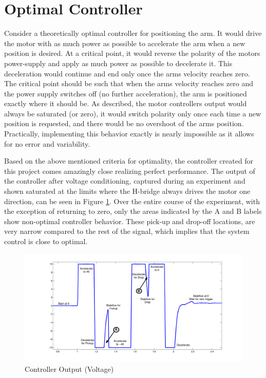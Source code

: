 \section{Optimal Controller}
\label{sec:idealcontroller}

Consider a theoretically optimal controller for positioning the arm.
It would drive the motor with as much power as possible to accelerate the arm when a new position is desired.
At a critical point, it would reverse the polarity of the motors power-supply and apply as much power as possible to decelerate it.
This deceleration would continue and end only once the arms velocity reaches zero.
The critical point should be such that when the arms velocity reaches zero and the power supply switches off (no further acceleration), the arm is positioned exactly where it should be. 
As described, the motor controllers output would always be saturated (or zero), it would switch polarity only once each time a new position is requested, and there would be no overshoot of the arms position. 
Practically, implementing this behavior exactly is nearly impossible as it allows for no error and variability.

Based on the above mentioned criteria for optimality, the controller created for this project comes amazingly close realizing perfect performance.
The output of the controller after voltage conditioning, captured during an experiment and shown saturated at the limits where the H-bridge always drives the motor one direction, can be seen in Figure \ref{fig:idealcontroller}.
Over the entire course of the experiment, with the exception of returning to zero, only the areas indicated by the A and B labels show non-optimal controller behavior.
These pick-up and drop-off locations, are very narrow compared to the rest of the signal, which implies that the system control is close to optimal.

\begin{figure}[htp]
    \centering
    \includegraphics[width=.95\textwidth]{images/IdealControllerVoltage.pdf}
    \caption{Controller Output (Voltage)}
    \label{fig:idealcontroller}
\end{figure}


